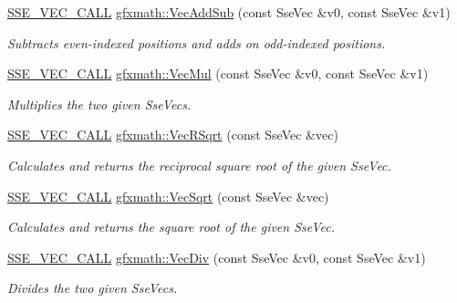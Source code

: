 \begin{DoxyCompactItemize}
\hyperlink{ssevec__math__defs_8h_a97454f977a5281455cecacce1e8ba670}{S\+S\+E\+\_\+\+V\+E\+C\+\_\+\+C\+A\+L\+L} \hyperlink{group___s_i_m_d_vec_math_gadb08bbdc4969ec93fcc4944b6ce24f41}{gfxmath\+::\+Vec\+Add\+Sub} (const Sse\+Vec \&v0, const Sse\+Vec \&v1)
\begin{DoxyCompactList}\small\item\em Subtracts even-\/indexed positions and adds on odd-\/indexed positions. \end{DoxyCompactList}\item 
\hyperlink{ssevec__math__defs_8h_a97454f977a5281455cecacce1e8ba670}{S\+S\+E\+\_\+\+V\+E\+C\+\_\+\+C\+A\+L\+L} \hyperlink{group___s_i_m_d_vec_math_gaa0e879cb47e52747b293046920b62c31}{gfxmath\+::\+Vec\+Mul} (const Sse\+Vec \&v0, const Sse\+Vec \&v1)
\begin{DoxyCompactList}\small\item\em Multiplies the two given Sse\+Vecs. \end{DoxyCompactList}\item 
\hyperlink{ssevec__math__defs_8h_a97454f977a5281455cecacce1e8ba670}{S\+S\+E\+\_\+\+V\+E\+C\+\_\+\+C\+A\+L\+L} \hyperlink{group___s_i_m_d_vec_math_ga970ae3ba26cdacbd0648dceb4762a690}{gfxmath\+::\+Vec\+R\+Sqrt} (const Sse\+Vec \&vec)
\begin{DoxyCompactList}\small\item\em Calculates and returns the reciprocal square root of the given Sse\+Vec. \end{DoxyCompactList}\item 
\hyperlink{ssevec__math__defs_8h_a97454f977a5281455cecacce1e8ba670}{S\+S\+E\+\_\+\+V\+E\+C\+\_\+\+C\+A\+L\+L} \hyperlink{group___s_i_m_d_vec_math_ga7e1945dc7600a364035073bfc31eba23}{gfxmath\+::\+Vec\+Sqrt} (const Sse\+Vec \&vec)
\begin{DoxyCompactList}\small\item\em Calculates and returns the square root of the given Sse\+Vec. \end{DoxyCompactList}\item 
\hyperlink{ssevec__math__defs_8h_a97454f977a5281455cecacce1e8ba670}{S\+S\+E\+\_\+\+V\+E\+C\+\_\+\+C\+A\+L\+L} \hyperlink{group___s_i_m_d_vec_math_ga0f942adcbe273e2e7039cb2b72db39a1}{gfxmath\+::\+Vec\+Div} (const Sse\+Vec \&v0, const Sse\+Vec \&v1)
\begin{DoxyCompactList}\small\item\em Divides the two given Sse\+Vecs. \end{DoxyCompactList}\item 

\end{DoxyCompactItemize}
